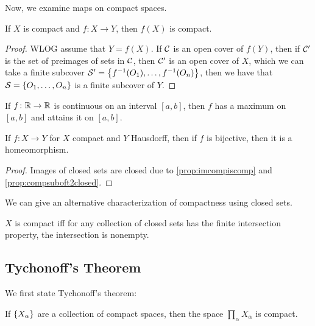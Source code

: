 Now, we examine maps on compact spaces.

\begin{proposition}
    \label{prop:imcompiscomp}
    If $X$ is compact and $f \colon X \to Y$, then $f(X)$ is compact.
\end{proposition}

\begin{proof}
    WLOG assume that $Y = f(X)$. If $\mathcal C$ is an open cover of $f(Y)$, then if $\mathcal C'$ is the set of preimages of sets in $\mathcal C$, then $\mathcal C'$ is an open cover of $X$, which we can take a finite subcover $\mathcal S' = \qty{f^{-1}(O_1), \dots, f^{-1}(O_n)}$, then we have that $\mathcal S = \qty{O_1, \dots, O_n}$ is a finite subcover of $Y$. 
\end{proof}

\begin{corollary}
    If $f \colon \mathbb R \to \mathbb R$ is continuous on an interval $[a, b]$, then $f$ has a maximum on $[a, b]$ and attains it on $[a, b]$. 
\end{corollary}

\begin{proposition}
    If $f\colon X \to Y$ for $X$ compact and $Y$ Hausdorff, then if $f$ is bijective, then it is a homeomorphism.
\end{proposition}

\begin{proof}
    Images of closed sets are closed due to \autoref{prop:imcompiscomp} and \autoref{prop:compsuboft2closed}.
\end{proof}

We can give an alternative characterization of compactness using closed sets.

\begin{proposition}
    $X$ is compact iff for any collection of closed sets has the finite intersection property, the intersection is nonempty.
\end{proposition}

\subsection{Tychonoff's Theorem}

We first state Tychonoff's theorem:

\begin{theorem}
    \label{thm:tychonoff}
    If $\qty{X_\alpha}$ are a collection of compact spaces, then the space $\prod_\alpha X_\alpha$ is compact.
\end{theorem}

